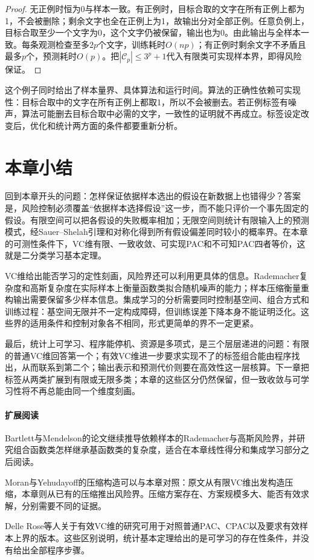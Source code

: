 \begin{proof}
无正例时恒为0与样本一致。有正例时，目标合取的文字在所有正例上都为1，不会被删除；剩余文字也全在正例上为1，故输出分对全部正例。任意负例上，目标合取至少一个文字为0，这个文字仍被保留，输出也为0。由此输出与全样本一致。每条观测检查至多$2p$个文字，训练耗时$O(np)$；有正例时剩余文字不矛盾且最多$p$个，预测耗时$O(p)$。把$|\mathcal C_p|\leq3^p+1$代入有限类可实现样本界，即得风险保证。
\end{proof}

这个例子同时给出了样本量界、具体算法和运行时间。算法的正确性依赖可实现性：目标合取中的文字在所有正例上都取1，所以不会被删去。若正例标签有噪声，算法可能删去目标合取中必需的文字，一致性的证明就不再成立。标签设定改变后，优化和统计两方面的条件都要重新分析。

\section{本章小结}
\label{sec:binary-learning-summary}

回到本章开头的问题：怎样保证依据样本选出的假设在新数据上也错得少？答案是，风险控制必须覆盖“依据样本选择假设”这一步，而不能只评价一个事先固定的假设。有限空间可以把各假设的失败概率相加；无限空间则统计有限输入上的预测模式，经Sauer--Shelah引理和对称化得到所有假设偏差同时较小的概率界。在本章的可测性条件下，VC维有限、一致收敛、可实现PAC和不可知PAC四者等价，这就是二分类学习基本定理。

VC维给出能否学习的定性刻画，风险界还可以利用更具体的信息。Rademacher复杂度和高斯复杂度在实际样本上衡量函数类拟合随机噪声的能力；样本压缩衡量重构输出需要保留多少样本信息。集成学习的分析需要同时控制基空间、组合方式和训练过程：基空间无限并不一定构成障碍，但训练误差下降本身不能证明泛化。这些界的适用条件和控制对象各不相同，形式更简单的界不一定更紧。

最后，统计上可学习、程序能停机、资源是多项式，是三个层层递进的问题：有限的普通VC维回答第一个；有效VC维进一步要求实现不了的标签组合能由程序找出，从而联系到第二个；输出表示和预测代价则要在高效性这一层核算。下一章把标签从两类扩展到有限或无限多类；本章的这些区分仍然保留，但一致收敛与可学习性将不再总能由同一个维度刻画。

\paragraph{扩展阅读}
Bartlett与Mendelson的论文继续推导依赖样本的Rademacher与高斯风险界，并研究组合函数类怎样继承基函数类的复杂度，适合在本章线性得分和集成学习部分之后阅读。

Moran与Yehudayoff的压缩构造可以与本章对照：原文从有限VC维出发构造压缩，本章则从已有的压缩推出风险界。压缩方案存在、方案规模多大、能否有效求解，分别需要不同的证据。

Delle Rose等人关于有效VC维的研究可用于对照普通PAC、CPAC以及要求有效样本上界的版本。这些区别说明，统计基本定理给出的是可学习的存在性条件，并没有给出全部程序步骤。
